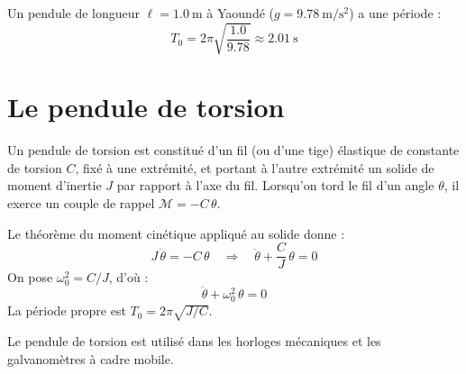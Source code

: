 \begin{exemple}
Un pendule de longueur $\ell = \SI{1.0}{\metre}$ à Yaoundé ($g = \SI{9.78}{\metre\per\second\squared}$) a une période :
\[
T_0 = 2\pi\sqrt{\frac{1.0}{9.78}} \approx \SI{2.01}{\second}
\]
\end{exemple}

\section{Le pendule de torsion}

\begin{definition}
Un pendule de torsion est constitué d'un fil (ou d'une tige) élastique de constante de torsion $C$, fixé à une extrémité, et portant à l'autre extrémité un solide de moment d'inertie $J$ par rapport à l'axe du fil. Lorsqu'on tord le fil d'un angle $\theta$, il exerce un couple de rappel $\mathcal{M} = -C\,\theta$.
\end{definition}

\begin{illus}
\end{illus}

\begin{loi}
Le théorème du moment cinétique appliqué au solide donne :
\[
J\,\ddot{\theta} = -C\,\theta \quad\Longrightarrow\quad \ddot{\theta} + \frac{C}{J}\,\theta = 0
\]
On pose $\omega_0^2 = C/J$, d'où :
\[
\boxed{\ddot{\theta} + \omega_0^2\,\theta = 0}
\]
La période propre est $T_0 = 2\pi\sqrt{J/C}$.
\end{loi}

\begin{remarque}
Le pendule de torsion est utilisé dans les horloges mécaniques et les galvanomètres à cadre mobile.
\end{remarque}

